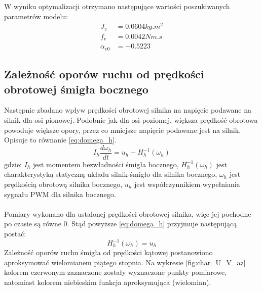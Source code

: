 \documentclass[11pt,a4paper]{article}
\begin{document}
W wyniku optymalizacji otrzymano następujące wartości poszukiwanych parametrów modelu:
\begin{equation}
\begin{aligned}
J_v &= 0.0604\si{kg.m^2}\\
f_v &= 0.0042\si{Nm.s}\\
\alpha_{v0} &= -0.5223
\end{aligned}
\end{equation}

\subsection{Zależność oporów ruchu od prędkości obrotowej śmigła bocznego}
Następnie zbadano wpływ prędkości obrotowej silnika na napięcie podawane na silnik dla osi pionowej. Podobnie jak dla osi poziomej, większa prędkość obrotowa powoduje większe opory, przez co mniejsze napięcie podawane jest na silnik. Opisuje to równanie \eqref{eq:domega_h}.
\begin{equation}
I_h\frac{d\omega_h}{dt} = u_h - H_h^{-1}(\omega_h)
\label{eq:domega_h}
\end{equation}
\noindent gdzie:\newline
\(I_h\) jest momentem bezwładności śmigła bocznego,\newline
\(H_h^{-1}(\omega_h)\) jest charakterystyką statyczną układu silnik-śmigło dla silnika bocznego,\newline
\(\omega_h\) jest prędkością obrotową silnika bocznego,\newline
\(u_h\) jest współczynnikiem wypełniania sygnału PWM dla silnika bocznego.
\paragraph*{}
Pomiary wykonano dla ustalonej prędkości obrotowej silnika, więc jej pochodne po czasie są równe \(0\). Stąd powyższe \eqref{eq:domega_h} przyjmuje następującą postać:
\begin{equation}
H_h^{-1}(\omega_h) = u_h
\end{equation}
Zależność oporów ruchu śmigła od prędkości kątowej postanowiono aproksymować wielomianem piątego stopnia. Na wykresie \ref{fig:char_U_V_az} kolorem czerwonym zaznaczone zostały wyznaczone punkty pomiarowe, natomiast kolorem niebieskim funkcja aproksymująca (wielomian).
\end{document}
